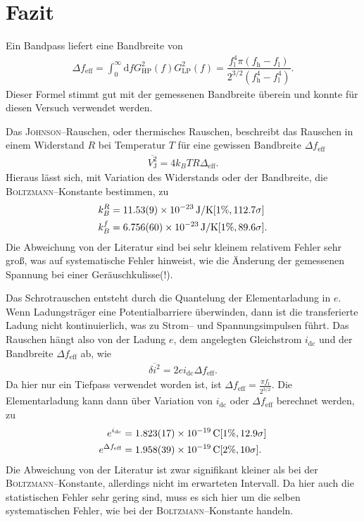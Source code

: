 \documentclass[sn-mathphys-num,iicol]{sn-jnl}
\theoremstyle{thmstyleone}
\theoremstyle{thmstyletwo}
\theoremstyle{thmstylethree}
\newcommand{\td}{\text{d}}
\begin{document}
\section{Fazit}
Ein Bandpass liefert eine Bandbreite von
\begin{align}
	\Delta f_\text{eff}=\int_{0}^{\infty}\td fG_\text{HP}^2(f)G_\text{LP}^2(f)=\dfrac{f_\text{l}^4\pi \left(f_\text{h}-f_\text{l}\right)}{2^{3/2}\left(f_\text{h}^4-f_\text{l}^4\right)}
	.\end{align}
Dieser Formel stimmt gut mit der gemessenen Bandbreite überein und konnte für diesen Versuch verwendet werden.

Das \textsc{Johnson}--Rauschen, oder thermisches Rauschen, beschreibt das Rauschen in einem Widerstand $R$ bei Temperatur $T$ für eine gewissen Bandbreite $\Delta f_\text{eff}$
\begin{align}
	\overline{V_\text{J}^2}=4k_BTR\Delta _\text{eff}
	.\end{align}
Hieraus lässt sich, mit Variation des Widerstands oder der Bandbreite, die \textsc{Boltzmann}--Konstante bestimmen, zu
\begin{align}
	k_B^R & = \SI{11.53+-0.09e-23}{J/K}[1\%,112.7\sigma ] \\
	k_B^f & = \SI{6.756+-0.06e-23}{J/K}[1\%,89.6\sigma ]
	.\end{align}
Die Abweichung von der Literatur sind bei sehr kleinem relativem Fehler sehr groß, was auf systematische Fehler hinweist, wie die Änderung der gemessenen Spannung bei einer Geräuschkulisse(!).

Das Schrotrauschen entsteht durch die Quantelung der Elementarladung in $e$.
Wenn Ladungsträger eine Potentialbarriere überwinden, dann ist die transferierte Ladung nicht kontinuierlich, was zu Strom-- und Spannungsimpulsen führt.
Das Rauschen hängt also von der Ladung $e$, dem angelegten Gleichstrom $i_\text{dc}$ und der Bandbreite $\Delta f_\text{eff}$ ab, wie
\begin{align}
	\overline{\delta i^2}=2ei_\text{dc}\Delta f_\text{eff}
	.\end{align}
Da hier nur ein Tiefpass verwendet worden ist, ist $\Delta f_\text{eff}=\tfrac{\pi f_\text{l}}{2^{3/2}}$.
Die Elementarladung kann dann über Variation von $i_\text{dc}$ oder $\Delta f_\text{eff}$ berechnet werden, zu
\begin{align}
	e^{i_\text{dc}}         & = \SI{1.823+-0.017e-19}{C}[1\%,12.9\sigma ] \\
	e^{\Delta f_\text{eff}} & = \SI{1.958+-0.039e-19}{C}[2\%,10\sigma ]
	.\end{align}
Die Abweichung von der Literatur ist zwar signifikant kleiner als bei der \textsc{Boltzmann}--Konstante, allerdings nicht im erwarteten Intervall.
Da hier auch die statistischen Fehler sehr gering sind, muss es sich hier um die selben systematischen Fehler, wie bei der \textsc{Boltzmann}--Konstante handeln.
\end{document}
